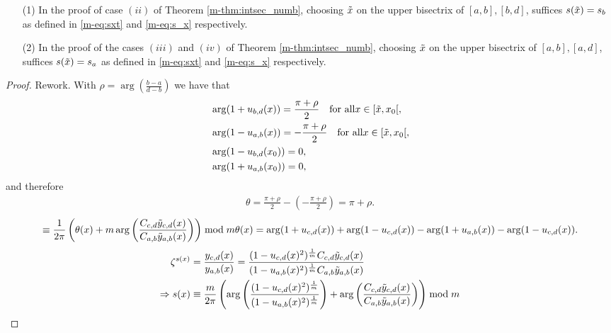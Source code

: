 \documentclass[main.tex]{subfiles}
\begin{document}
\begin{lemma}\label{lemma:sxt=sx}
  \begin{itemize}
   \item[(1)] In the proof of case $(ii)$ of Theorem \ref{m-thm:intsec_numb}, choosing $\tilde{x}$ on the upper bisectrix
   of $[a,b],[b,d]$, suffices $s(\tilde{x}) = s_b$ as defined in \eqref{m-eq:sxt} and \eqref{m-eq:s_x} respectively.
    \item[(2)] In the proof of the cases $(iii)$ and $(iv)$ of Theorem \ref{m-thm:intsec_numb}, choosing $\tilde{x}$ on the upper bisectrix
   of $[a,b],[a,d]$, suffices $s(\tilde{x}) = s_a$ as defined in \eqref{m-eq:sxt} and \eqref{m-eq:s_x} respectively.
  \end{itemize}
\end{lemma}
 \begin{proof}
 \todo Rework.
  With $\rho = \arg\left(\frac{b-a}{d-b}\right)$ we have that
  \begin{align*}
   & \arg (1+u_{b,d}(x)) = \frac{\pi+\rho}{2} \quad \text{for all}  x \in [\tilde{x},x_0[,\\
   & \arg (1-u_{a,b}(x)) = -\frac{\pi+\rho}{2} \quad \text{for all}  x \in [\tilde{x},x_0[,\\
   & \arg (1-u_{b,d}(x_0)) = 0,\\
   & \arg (1+u_{a,b}(x_0))= 0,
  \end{align*}
  and therefore
  \begin{align*}
   \theta = \frac{\pi+\rho}{2} - \left(-\frac{\pi+\rho}{2}\right) = \pi + \rho.
  \end{align*}
  \begin{equation}
   \equiv \frac{1}{2\pi}\left( \theta(x) + m \arg \left( \frac{ C_{c,d} \tilde{y}_{c,d}(x)}{ C_{a,b}
   \tilde{y}_{a,b}(x)} \right) \right) \bmod m
   \theta(x) = \arg(1+u_{c,d}(x)) + \arg(1-u_{c,d}(x)) - \arg(1+u_{a,b}(x)) - \arg(1-u_{c,d}(x)).
  \end{equation}
    \begin{align}\label{eq:s(x)2}
  \begin{split}
   \zeta^{s(x)} & = \frac{y_{c,d}(x)}{y_{a,b}(x)} = \frac{(1- u_{c,d}(x)^2)^{\frac{1}{m}} C_{c,d} \tilde{y}_{c,d}(x) }{(1-u_{a,b}(x)^2)^{\frac{1}{m}} C_{a,b} \tilde{y}_{a,b}(x)} \\
   \Rightarrow  s(x) & \equiv \frac{m}{2\pi} \left( \arg \left( \frac{(1- u_{c,d}(x)^2)^{\frac{1}{m}}}{(1-u_{a,b}(x)^2)^{\frac{1}{m}}} \right) + \arg \left( \frac{ C_{c,d} \tilde{y}_{c,d}(x)}{ C_{a,b}
   \tilde{y}_{a,b}(x)} \right) \right) \bmod m
  \end{split}
  \end{align}
 \end{proof}
\end{document}
